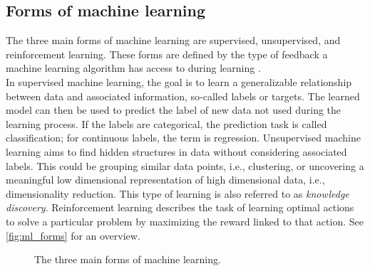 \subsection{Forms of machine learning}
\label{theory:ml:forms}
The three main forms of machine learning are supervised, unsupervised, and reinforcement learning. These forms are defined by the type of feedback a machine learning algorithm has access to during learning \cite{Shalev2014}.\\
In supervised machine learning, the goal is to learn a generalizable relationship between data and associated information, so-called labels or targets. The learned model can then be used to predict the label of new data not used during the learning process. If the labels are categorical, the prediction task is called classification; for continuous labels, the term is regression. Unsupervised machine learning aims to find hidden structures in data without considering associated labels. This could be grouping similar data points, i.e., clustering, or uncovering a meaningful low dimensional representation of high dimensional data, i.e., dimensionality reduction. This type of learning is also referred to as \textit{knowledge discovery}\cite{Murphy2012}. Reinforcement learning describes the task of learning optimal actions to solve a particular problem by maximizing the reward linked to that action. See \autoref{fig:ml_forms} for an overview.

\begin{figure}[h]
\begin{center}
\end{center}
\caption[The three main forms of machine learning.]{The three main forms of machine learning.}
\label{fig:ml_forms}
\end{figure}

